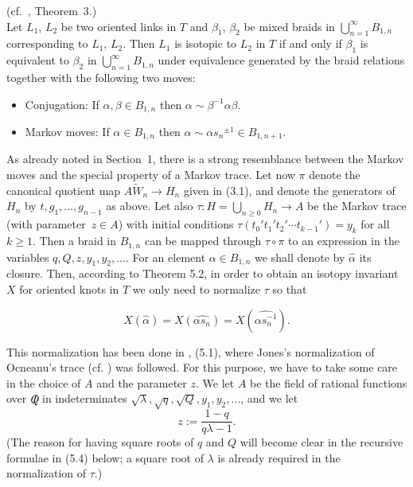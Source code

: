 \addtocounter{thm}{1}
\begin{thm} {\rm (cf.\ \cite{L2}, Theorem~3.)}\\
Let $L_1$,  $L_2$  be  two oriented  links  in $T$   and  ${\beta}_1$,
${\beta}_2$  be  mixed   braids  in  $\bigcup_{n=1}^{\infty}  B_{1,n}$
corresponding to $L_1$, $L_2$. Then $L_1$ is  isotopic to $L_2$ in $T$
if and   only  if    ${\beta}_1$  is  equivalent  to   ${\beta}_2$  in
$\bigcup_{n=1}^{\infty} B_{1,n}$  under  equivalence generated by  the
braid relations together with the following two moves:
\begin{itemize}
\item[(i)] Conjugation: If $\alpha,\beta \in B_{1,n}$
then $\alpha \sim \beta ^{-1}\alpha\beta$.
\item[(ii)] Markov moves: If $\alpha \in B_{1,n}$ then $\alpha \sim
\alpha{s_n}^{\pm 1}\in B_{1,n+1}$. 
\end{itemize}
\end{thm}

\noindent As already noted in  Section~1, there is  a strong resemblance  
between the Markov  moves and the special  property of a Markov trace.
Let  now $\pi$  denote    the canonical  quotient  map   $A\tilde{W}_n
\rightarrow H_n$ given in (3.1), and denote the generators of $H_n$ by
$t,g_1,\ldots,g_{n-1}$  as above. Let  also $\tau:H=\bigcup_{n \geq 0}
H_n \rightarrow A$ be the Markov trace (with parameter~$z \in A$) with
initial conditions $\tau(t_0't_1't_2' \cdots t_{k-1}')=y_k$ for all $k
\geq 1$.  Then   a braid  in $B_{1,n}$  can  be mapped  through  $\tau
\circ \pi$ to  an expression in  the variables $q, Q,  z, y_1, y_2, \ldots$.  
For an element $\alpha \in  B_{1,n}$ we shall denote by $\widehat{\alpha}$ 
its  closure. Then,  according to Theorem   5.2, in order to obtain an 
isotopy invariant $X$ for oriented  knots in $T$ we only need to  normalize  
$\tau$  so that  

\[X (\widehat{\alpha})=X(\widehat{\alpha{s_n}})=X(\widehat{\alpha s_n^{-1}}).\] 

This normalization has been done in \cite{L2}, (5.1), where   Jones's
normalization of Ocneanu's trace (cf.  \cite{Jones}) was followed. For
this purpose, we have to take some care  in the choice  of $A$ and the
parameter $z$.  We let  $A$ be  the field  of rational functions  over
$\mbox{$Q\!\!\!\! I$}$  in   indeterminates $\sqrt{\lambda},\sqrt{q},\sqrt{Q},y_1,y_2,
\ldots$, and we let \[ z:=\frac{1-q}{q\lambda-1}.\]
(The reason for having square roots of $q$ and $Q$ will become clear
in the recursive formulae in (5.4) below; a square root of $\lambda$
is already required in the normalization of $\tau$.)

